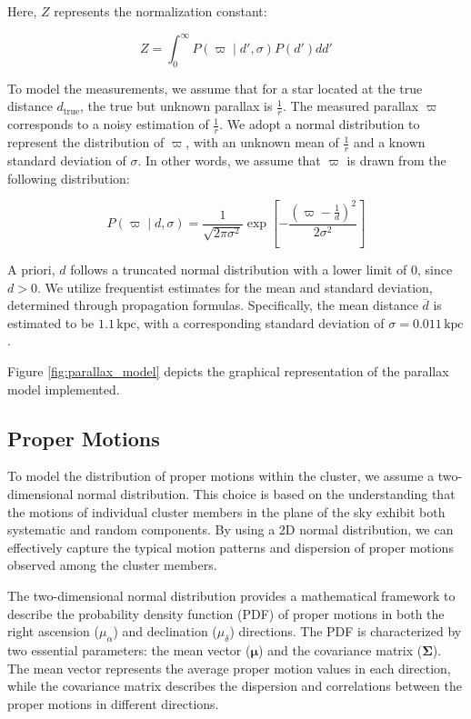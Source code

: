 \documentclass[fleqn,usenatbib,usedcolumn,useAMS]{mnras}
\begin{document}
Here, $Z$ represents the normalization constant:

\begin{equation*}
Z = \int_{0}^\infty P(\varpi \mid d',\sigma)P(d') dd'
\end{equation*}

To model the measurements, we assume that for a star located at the true distance $d_{\text{true}}$, the true but unknown parallax is $\frac{1}{r}$. The measured parallax $\varpi$ corresponds to a noisy estimation of $\frac{1}{r}$. We adopt a normal distribution to represent the distribution of $\varpi$, with an unknown mean of $\frac{1}{r}$ and a known standard deviation of $\sigma$. In other words, we assume that $\varpi$ is drawn from the following distribution:

\begin{equation*}
P(\varpi \mid d,\sigma) = \frac{1}{\sqrt{2\pi \sigma^2}} \exp{\left[ - \frac{\left(\varpi - \frac{1}{d}\right)^2}{2\sigma^2}\right]}
\end{equation*}

A priori, $d$ follows a truncated normal distribution with a lower limit of $0$, since $d > 0$. We utilize frequentist estimates for the mean and standard deviation, determined through propagation formulas. Specifically, the mean distance $\overline{d}$ is estimated to be $1.1\,\text{kpc}$, with a corresponding standard deviation of $\sigma = 0.011\,\text{kpc}$.

Figure \ref{fig:parallax_model} depicts the graphical representation of the parallax model implemented.

\subsection{Proper Motions}

To model the distribution of proper motions within the cluster, we assume a two-dimensional normal distribution. This choice is based on the understanding that the motions of individual cluster members in the plane of the sky exhibit both systematic and random components. By using a 2D normal distribution, we can effectively capture the typical motion patterns and dispersion of proper motions observed among the cluster members.

The two-dimensional normal distribution provides a mathematical framework to describe the probability density function (PDF) of proper motions in both the right ascension ($\mu_{\alpha}$) and declination ($\mu_{\delta}$) directions. The PDF is characterized by two essential parameters: the mean vector ($\boldsymbol{\mu}$) and the covariance matrix ($\boldsymbol{\Sigma}$). The mean vector represents the average proper motion values in each direction, while the covariance matrix describes the dispersion and correlations between the proper motions in different directions.
\end{document}
